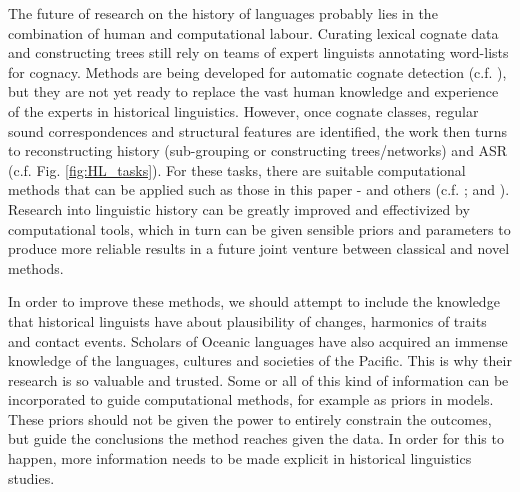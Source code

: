 \documentclass[12pt,letterpaper]{article}
\begin{document}





The future of research on the history of languages probably lies in the combination of human and computational labour. Curating lexical cognate data \citep{list2022lexibank} and constructing trees \citep{grayetal_2009} still rely on teams of expert linguists annotating word-lists for cognacy. Methods are being developed for automatic cognate detection (c.f. \citet{list2017potential}), but they are not yet ready to replace the vast human knowledge and experience of the experts in historical linguistics. However, once cognate classes, regular sound correspondences and structural features are identified, the work then turns to reconstructing history (sub-grouping or constructing trees/networks) and ASR (c.f. Fig. \ref{fig:HL_tasks}). For these tasks, there are suitable computational methods that can be applied such as those in this paper - and others (c.f. \citet{greenhill2015evolution}; \citet{gray_greenhill_defend_bayes} and \citet{joy2016ancestral}). Research into linguistic history can be greatly improved and effectivized by computational tools, which in turn can be given sensible priors and parameters to produce more reliable results in a future joint venture between classical and novel methods.

In order to improve these methods, we should attempt to include the knowledge that historical linguists have about plausibility of changes, harmonics of traits and contact events. Scholars of Oceanic languages have also acquired an immense knowledge of the languages, cultures and societies of the Pacific. This is why their research is so valuable and trusted. Some or all of this kind of information can be incorporated to guide computational methods, for example as priors in models. These priors should not be given the power to entirely constrain the outcomes, but guide the conclusions the method reaches given the data. In order for this to happen, more information needs to be made explicit in historical linguistics studies.
\end{document}
